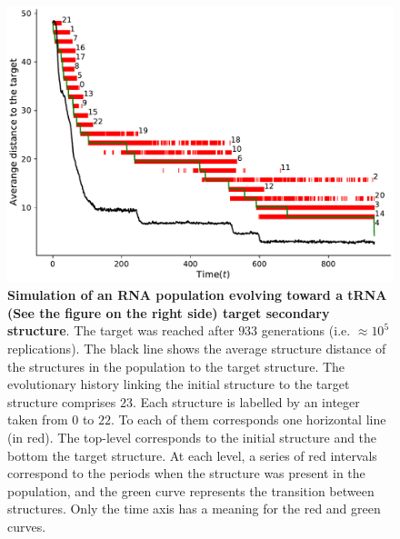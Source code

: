 \begin{figure}[t!]
	\includegraphics[width=1.0\linewidth]{../res/images/continuity_RNAfold.pdf}
	\caption{\textbf{Simulation of an RNA population evolving toward a tRNA (See the figure on the right side) target secondary structure}. The target was reached after $933$ generations (i.e. $\approx 10^5$ replications). The black line shows the average structure distance of the structures in the population to the target structure. The evolutionary history linking the initial structure to the target structure comprises $23$. Each structure is labelled by an integer taken from $0$ to $22$. To each of them corresponds one horizontal line (in red). The top-level corresponds to the initial structure and the bottom the target structure. At each level, a series of red intervals correspond to the periods when the structure was present in the population, and the green curve represents the transition between structures. Only the time axis has a meaning for the red and green curves. }\label{fig:contiuity}
\end{figure}
